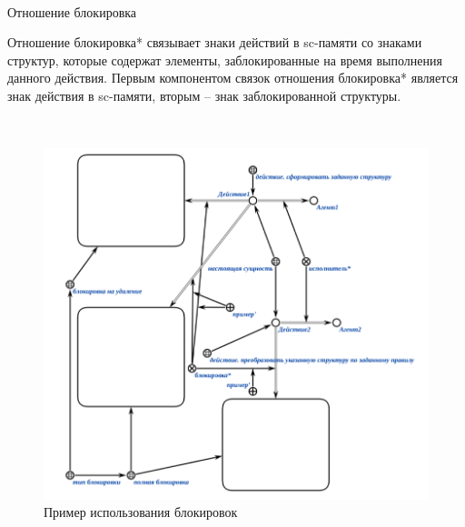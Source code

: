 \begin{frame}{\\Отношение блокировка}
	\topline
\justifying
\begin{SCn}
\end{SCn}
Отношение блокировка* связывает знаки действий в sc-памяти со знаками структур, которые содержат элементы, заблокированные на время выполнения данного действия. Первым компонентом связок отношения блокировка* является знак действия в sc-памяти, вторым – знак заблокированной структуры.
\end{frame}
\begin{frame}{\\}
		\topline
	\justifying
	\vspace{3em}
	\begin{figure}[H]
		\includegraphics[scale=0.25]{./figures/sd_multiagent_processing/blocking_example.png}
		\caption{Пример использования блокировок}
	\end{figure}
\end{frame}

